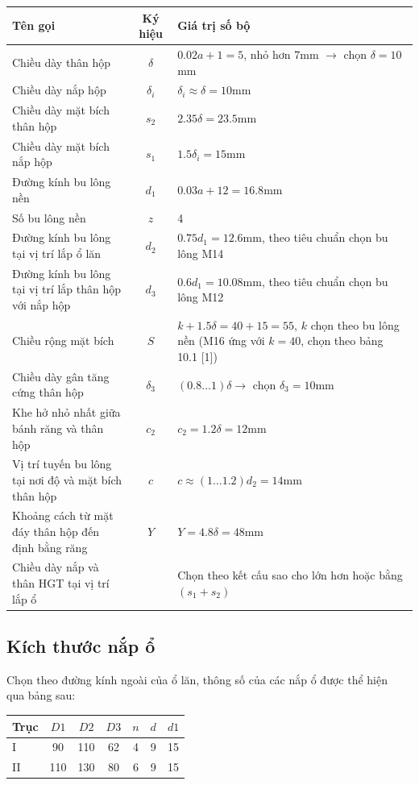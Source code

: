 \begin{table}[H]
    \centering
    \begin{tabular}{|p{5cm}|c|p{7cm}|} %
    \hline
    \textbf{Tên gọi} & \textbf{Ký hiệu} & \textbf{Giá trị số bộ} \\
    \hline
    Chiều dày thân hộp & $\delta$ & $0.02a + 1 = 5$, nhỏ hơn 7mm $\rightarrow$ chọn $\delta = 10$mm \\
    \hline
    Chiều dày nắp hộp & $\delta_i$ & $\delta_i \approx \delta = 10$mm \\
    \hline
    Chiều dày mặt bích thân hộp & $s_2$ & $2.35\delta = 23.5$mm \\
    \hline
    Chiều dày mặt bích nắp hộp & $s_1$ & $1.5\delta_i = 15$mm \\
    \hline
    Đường kính bu lông nền & $d_1$ & $0.03a + 12 = 16.8$mm \\
    \hline
    Số bu lông nền & $z$ & 4 \\
    \hline
    Đường kính bu lông tại vị trí lắp ổ lăn & $d_2$ & $0.75d_1 = 12.6$mm, theo tiêu chuẩn chọn bu lông M14 \\
    \hline
    Đường kính bu lông tại vị trí lắp thân hộp với nắp hộp & $d_3$ & $0.6d_1 = 10.08$mm, theo tiêu chuẩn chọn bu lông M12 \\
    \hline
    Chiều rộng mặt bích & $S$ & $k + 1.5\delta = 40 + 15 = 55$, $k$ chọn theo bu lông nền (M16 ứng với $k=40$, chọn theo bảng 10.1 [1]) \\
    \hline
    Chiều dày gân tăng cứng thân hộp & $\delta_3$ & $(0.8 \ldots 1)\delta \rightarrow$ chọn $\delta_3 = 10$mm \\
    \hline
    Khe hở nhỏ nhất giữa bánh răng và thân hộp & $c_2$ & $c_2 = 1.2\delta = 12$mm \\
    \hline
    Vị trí tuyến bu lông tại nơi độ và mặt bích thân hộp & $c$ & $c \approx (1 \ldots 1.2)d_2 = 14$mm \\
    \hline
    Khoảng cách từ mặt đáy thân hộp đến định bằng răng & $Y$ & $Y = 4.8\delta = 48$mm \\
    \hline
    Chiều dày nắp và thân HGT tại vị trí lắp ổ & & Chọn theo kết cấu sao cho lớn hơn hoặc bằng $(s_1 + s_2)$ \\
    \hline
    \end{tabular}
    \end{table}
\subsection{Kích thước nắp ổ}
Chọn theo đường kính ngoài của ổ lăn, thông số của các nắp ổ được thể hiện \\qua bảng sau:
\begin{table}[H]
    \centering
    \begin{tabular}{|l|c|c|c|c|c|c|}
    \hline
    \textbf{Trục} & \textbf{$D1$} & \textbf{$D2$} & \textbf{$D3$} & \textbf{$n$} & \textbf{$d$} & \textbf{$d1$} \\
    \hline
    I & 90 & 110 & 62 & 4 & 9 & 15 \\
    \hline
    II & 110 & 130 & 80 & 6 & 9 & 15 \\
    \hline
    \end{tabular}
\end{table}
\cleardoublepage
